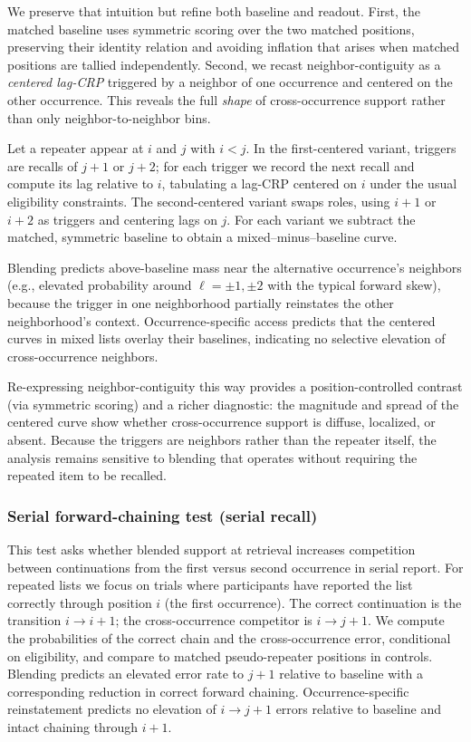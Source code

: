 \documentclass[
  man,
  floatsintext,
  longtable,
  nolmodern,
  notxfonts,
  notimes,
  draftfirst,
  colorlinks=true,linkcolor=blue,citecolor=blue,urlcolor=blue]{apa7}
\begin{document}
We preserve that intuition but refine both baseline and readout. First,
the matched baseline uses symmetric scoring over the two matched
positions, preserving their identity relation and avoiding inflation
that arises when matched positions are tallied independently. Second, we
recast neighbor-contiguity as a \emph{centered lag-CRP} triggered by a
neighbor of one occurrence and centered on the other occurrence. This
reveals the full \emph{shape} of cross-occurrence support rather than
only neighbor-to-neighbor bins.

Let a repeater appear at \(i\) and \(j\) with \(i<j\). In the
first-centered variant, triggers are recalls of \(j{+}1\) or \(j{+}2\);
for each trigger we record the next recall and compute its lag relative
to \(i\), tabulating a lag-CRP centered on \(i\) under the usual
eligibility constraints. The second-centered variant swaps roles, using
\(i{+}1\) or \(i{+}2\) as triggers and centering lags on \(j\). For each
variant we subtract the matched, symmetric baseline to obtain a
mixed--minus--baseline curve.

Blending predicts above-baseline mass near the alternative occurrence's
neighbors (e.g., elevated probability around \(\ell=\pm1,\pm2\) with the
typical forward skew), because the trigger in one neighborhood partially
reinstates the other neighborhood's context. Occurrence-specific access
predicts that the centered curves in mixed lists overlay their
baselines, indicating no selective elevation of cross-occurrence
neighbors.

Re-expressing neighbor-contiguity this way provides a
position-controlled contrast (via symmetric scoring) and a richer
diagnostic: the magnitude and spread of the centered curve show whether
cross-occurrence support is diffuse, localized, or absent. Because the
triggers are neighbors rather than the repeater itself, the analysis
remains sensitive to blending that operates without requiring the
repeated item to be recalled.

\subsubsection{Serial forward-chaining test (serial
recall)}\label{serial-forward-chaining-test-serial-recall}

This test asks whether blended support at retrieval increases
competition between continuations from the first versus second
occurrence in serial report. For repeated lists we focus on trials where
participants have reported the list correctly through position \(i\)
(the first occurrence). The correct continuation is the transition
\(i\rightarrow i{+}1\); the cross-occurrence competitor is
\(i\rightarrow j{+}1\). We compute the probabilities of the correct
chain and the cross-occurrence error, conditional on eligibility, and
compare to matched pseudo-repeater positions in controls. Blending
predicts an elevated error rate to \(j{+}1\) relative to baseline with a
corresponding reduction in correct forward chaining. Occurrence-specific
reinstatement predicts no elevation of \(i\rightarrow j{+}1\) errors
relative to baseline and intact chaining through \(i{+}1\).
\end{document}
